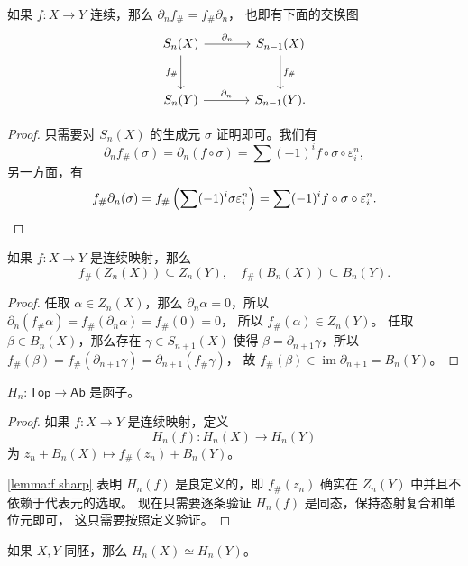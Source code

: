\documentclass[fontset=none]{Notes}
\DeclareMathOperator\im{im}
\newcommand{\cat}[1]{\mathsf{#1}}
\begin{document}
\begin{lemma}
  如果 $f:X\to Y$ 连续，那么 $\partial_n f_\#=f_\#\partial_n$，
  也即有下面的交换图
  \[
    \begin{tikzcd}[sep=large]
     S_n(X)\arrow[r,"\partial_n"]\arrow[d,"f_\#"']
     & S_{n-1}(X)\arrow[d,"f_\#"] \\
     S_n(Y)\arrow[r,"\partial_n"] & S_{n-1}(Y). 
    \end{tikzcd}
  \]
\end{lemma}
\begin{proof}
  只需要对 $S_n(X)$ 的生成元 $\sigma$ 证明即可。我们有
  \[
    \partial_n f_\#(\sigma)=\partial_n(f\circ\sigma)
    =\sum (-1)^i f\circ\sigma \circ\varepsilon_i^{n},
  \]
  另一方面，有
  \[
    f_\#\partial_n(\sigma)=f_\#\left(\sum(-1)^i\sigma\varepsilon_i^n\right)
    =\sum (-1)^i f\circ\sigma\circ\varepsilon_i^n.\qedhere
  \]
\end{proof}

\begin{lemma}\label{lemma:f sharp}
  如果 $f:X\to Y$ 是连续映射，那么
  \[
    f_\#(Z_n(X))\subseteq Z_n(Y),\quad 
    f_\#(B_n(X))\subseteq B_n(Y).
  \]
\end{lemma}
\begin{proof}
  任取 $\alpha\in Z_n(X)$，那么 $\partial_n\alpha=0$，所以
  $\partial_n(f_\#\alpha)=f_\#(\partial_n\alpha)=f_\#(0)=0$，
  所以 $f_\#(\alpha)\in Z_n(Y)$。
  任取 $\beta\in B_n(X)$，那么存在 $\gamma\in S_{n+1}(X)$
  使得 $\beta=\partial_{n+1}\gamma$，所以
  $f_\#(\beta)=f_\#(\partial_{n+1}\gamma)=\partial_{n+1}(f_\#\gamma)$，
  故 $f_{\#}(\beta)\in\im\partial_{n+1}=B_n(Y)$。
\end{proof}

\begin{theorem}
  $H_n:\cat{Top}\to\cat{Ab}$ 是函子。
\end{theorem}
\begin{proof}
  如果 $f:X\to Y$ 是连续映射，定义
  \[
    H_n(f):H_n(X)\to H_n(Y)
  \]
  为 $z_n+B_n(X)\mapsto f_\# (z_n)+B_n(Y)$。

  \autoref{lemma:f sharp} 表明 $H_n(f)$ 是良定义的，即
  $f_\#(z_n)$ 确实在 $Z_n(Y)$ 中并且不依赖于代表元的选取。
  现在只需要逐条验证 $H_n(f)$ 是同态，保持态射复合和单位元即可，
  这只需要按照定义验证。
\end{proof}

\begin{corollary}
  如果 $X,Y$ 同胚，那么 $H_n(X)\simeq H_n(Y)$。
\end{corollary}
\end{document}
